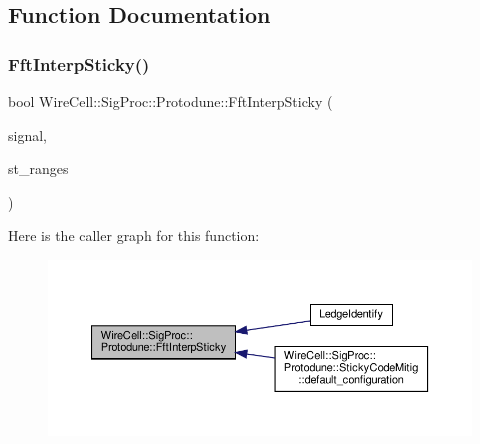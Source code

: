\subsection{Function Documentation}
\mbox{\label{namespace_wire_cell_1_1_sig_proc_1_1_protodune_a7bc8b6b7f87df0120589d4a2a0a77c4e}} 
\subsubsection{\texorpdfstring{Fft\+Interp\+Sticky()}{FftInterpSticky()}}
{\footnotesize\ttfamily bool Wire\+Cell\+::\+Sig\+Proc\+::\+Protodune\+::\+Fft\+Interp\+Sticky (\begin{DoxyParamCaption}\item[{\hyperlink{namespace_wire_cell_1_1_waveform_a479175e541c8545e87cd8063b74b6956}{Wire\+Cell\+::\+Waveform\+::realseq\+\_\+t} \&}]{signal,  }\item[{std\+::vector$<$ std\+::pair$<$ int, int $>$ $>$ \&}]{st\+\_\+ranges }\end{DoxyParamCaption})}

Here is the caller graph for this function\+:
\nopagebreak
\begin{figure}[H]
\begin{center}
\leavevmode
\includegraphics[width=350pt]{namespace_wire_cell_1_1_sig_proc_1_1_protodune_a7bc8b6b7f87df0120589d4a2a0a77c4e_icgraph}
\end{center}
\end{figure}
\mbox{\label{namespace_wire_cell_1_1_sig_proc_1_1_protodune_a70a419137440aaee4a7afd4366c10404}} 
